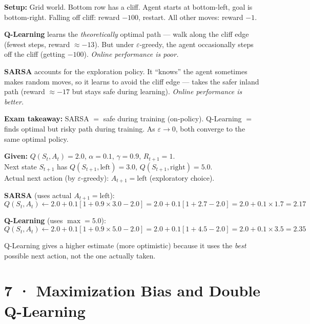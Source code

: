 \documentclass[11pt,a4paper]{article}
\begin{document}
\begin{tcolorbox}[exam={Cliff Walking Example — SARSA vs Q-Learning (must know)}]
\textbf{Setup:} Grid world. Bottom row has a cliff. Agent starts at bottom-left, goal is bottom-right.
Falling off cliff: reward $-100$, restart. All other moves: reward $-1$.

\medskip
\textbf{Q-Learning} learns the \emph{theoretically} optimal path — walk along the cliff edge
(fewest steps, reward $\approx -13$). But under $\varepsilon$-greedy, the agent occasionally steps
off the cliff (getting $-100$). \emph{Online performance is poor.}

\medskip
\textbf{SARSA} accounts for the exploration policy. It ``knows'' the agent sometimes makes random moves,
so it learns to avoid the cliff edge — takes the safer inland path (reward $\approx -17$ but stays
safe during learning). \emph{Online performance is better.}

\medskip
\textbf{Exam takeaway:}
SARSA $=$ safe during training (on-policy). Q-Learning $=$ finds optimal but risky path during training.
As $\varepsilon \to 0$, both converge to the same optimal policy.
\end{tcolorbox}

\begin{tcolorbox}[exam={Worked Trace — SARSA vs Q-Learning on same transition}]
\textbf{Given:} $Q(S_t, A_t) = 2.0$, $\alpha = 0.1$, $\gamma = 0.9$, $R_{t+1} = 1$.\\
Next state $S_{t+1}$ has $Q(S_{t+1}, \text{left}) = 3.0$, $Q(S_{t+1}, \text{right}) = 5.0$.\\
Actual next action (by $\varepsilon$-greedy): $A_{t+1} = \text{left}$ (exploratory choice).

\medskip
\textbf{SARSA} (uses actual $A_{t+1} = \text{left}$):
\[
  Q(S_t, A_t) \leftarrow 2.0 + 0.1[1 + 0.9 \times 3.0 - 2.0]
             = 2.0 + 0.1[1 + 2.7 - 2.0]
             = 2.0 + 0.1 \times 1.7 = \mathbf{2.17}
\]

\textbf{Q-Learning} (uses $\max = 5.0$):
\[
  Q(S_t, A_t) \leftarrow 2.0 + 0.1[1 + 0.9 \times 5.0 - 2.0]
             = 2.0 + 0.1[1 + 4.5 - 2.0]
             = 2.0 + 0.1 \times 3.5 = \mathbf{2.35}
\]

Q-Learning gives a higher estimate (more optimistic) because it uses the \emph{best} possible
next action, not the one actually taken.
\end{tcolorbox}

\section*{7 · Maximization Bias and Double Q-Learning}
\end{document}
